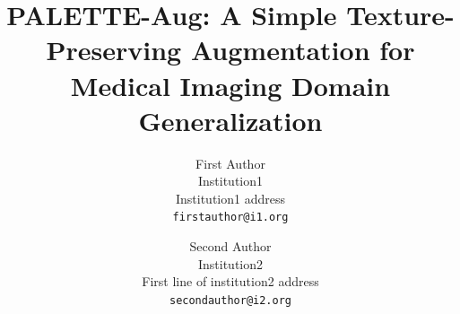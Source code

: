\documentclass[10pt,twocolumn,letterpaper]{article}
\title{PALETTE-Aug: A Simple Texture-Preserving Augmentation for\\Medical Imaging Domain Generalization}
\author{First Author\\
Institution1\\
Institution1 address\\
{\tt\small firstauthor@i1.org}
\and
Second Author\\
Institution2\\
First line of institution2 address\\
{\tt\small secondauthor@i2.org}
}
\begin{document}
\maketitle
    





{
    \small
    \label{endofmaintext}
    
    
}


\end{document}
